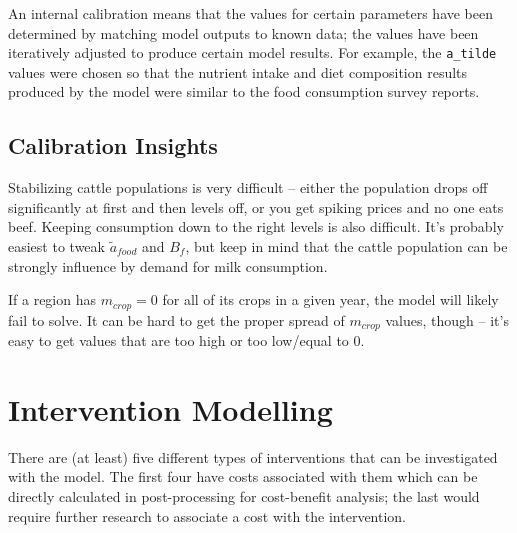 \documentclass[letter,12pt]{article}
\begin{document}
An internal calibration means that the values for certain parameters have been determined by matching model outputs to known data; the values have been iteratively adjusted to produce certain model results.  For example, the \verb!a_tilde! values were chosen so that the nutrient intake and diet composition results produced by the model were similar to the food consumption survey reports.


\subsection{Calibration Insights}

Stabilizing cattle populations is very difficult -- either the population drops off significantly at first and then levels off, or you get spiking prices and no one eats beef.  Keeping consumption down to the right levels is also difficult.  It's probably easiest to tweak $\tilde{a}_{food}$ and $B_f$, but keep in mind that the cattle population can be strongly influence by demand for milk consumption.

If a region has $m_{crop} = 0$ for all of its crops in a given year, the model will likely fail to solve.  It can be hard to get the proper spread of $m_{crop}$ values, though -- it's easy to get values that are too high or too low/equal to 0.

\section{Intervention Modelling}

There are (at least) five different types of interventions that can be investigated with the model.  The first four have costs associated with them which can be directly calculated in post-processing for cost-benefit analysis; the last would require further research to associate a cost with the intervention.
\end{document}
